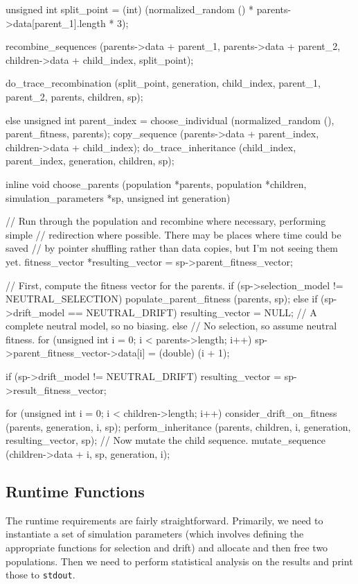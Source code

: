 \documentclass{article}
\begin{document}
\begin{ccode}
{{    unsigned int split_point = (int)
      (normalized_random () * parents->data[parent_1].length * 3);

    recombine_sequences (parents->data + parent_1,
			 parents->data + parent_2,
			 children->data + child_index,
			 split_point);

    do_trace_recombination (split_point, generation, child_index, parent_1,
			    parent_2, parents, children, sp);
  } else {
    unsigned int parent_index = choose_individual (normalized_random (), parent_fitness, parents);
    copy_sequence (parents->data + parent_index, children->data + child_index);
    do_trace_inheritance (child_index, parent_index, generation, children, sp);
  }
}

inline void choose_parents (population *parents, population *children,
                      simulation_parameters *sp, unsigned int generation) {
  // Run through the population and recombine where necessary, performing simple
  // redirection where possible. There may be places where time could be saved
  // by pointer shuffling rather than data copies, but I’m not seeing them yet.
  fitness_vector *resulting_vector = sp->parent_fitness_vector;

  // First, compute the fitness vector for the parents.
  if (sp->selection_model != NEUTRAL_SELECTION)
    populate_parent_fitness (parents, sp);
  else if (sp->drift_model == NEUTRAL_DRIFT)
    resulting_vector = NULL; // A complete neutral model, so no biasing.
  else
    // No selection, so assume neutral fitness.
    for (unsigned int i = 0; i < parents->length; i++)
      sp->parent_fitness_vector->data[i] = (double) (i + 1);

  if (sp->drift_model != NEUTRAL_DRIFT)
    resulting_vector = sp->result_fitness_vector;

  for (unsigned int i = 0; i < children->length; i++) {
    consider_drift_on_fitness (parents, generation, i, sp);
    perform_inheritance (parents, children, i, generation, resulting_vector, sp);
    // Now mutate the child sequence.
    mutate_sequence (children->data + i, sp, generation, i);
  }
}
\end{ccode}

    \subsection{Runtime Functions}

      The runtime requirements are fairly straightforward. Primarily, we need to
      instantiate a set of simulation parameters (which involves defining the
	  appropriate functions for selection and drift) and allocate and then
      free two populations. Then we need to perform statistical analysis on the
      results and print those to \verb|stdout|.
\end{document}
